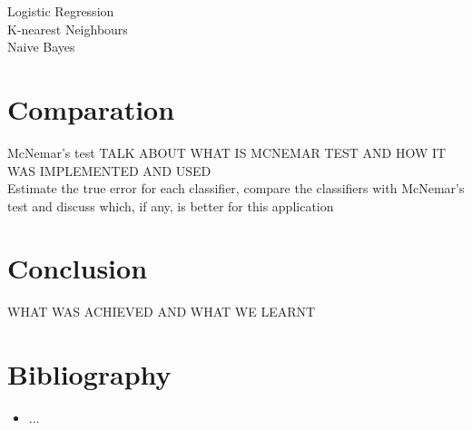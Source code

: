 \documentclass[a4paper]{article}
\begin{document}
\large Logistic Regression\\

\large K-nearest Neighbours \\

\large Naive Bayes\\

\section{Comparation}

\large McNemar's test
TALK ABOUT WHAT IS MCNEMAR TEST AND HOW IT WAS IMPLEMENTED AND USED\\
Estimate the true error for each classifier, compare the classifiers with McNemar's test and discuss which, if any, is better for this application\\


\section{Conclusion}
WHAT WAS ACHIEVED AND WHAT WE LEARNT\\

\section{Bibliography}
\begin{itemize}
\item ...\\
\end{itemize}
\end{document}
